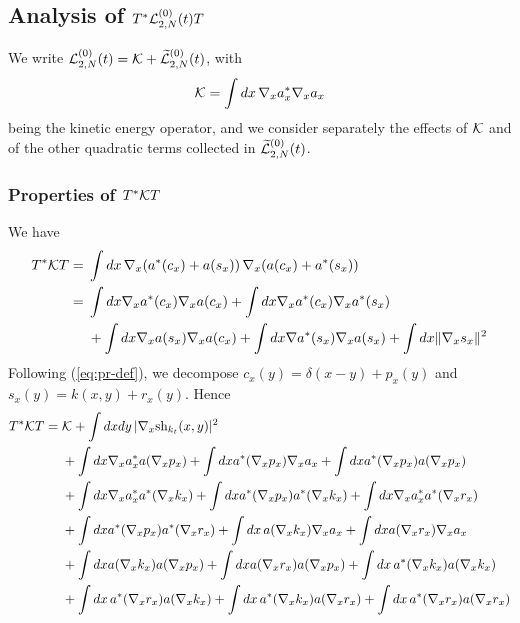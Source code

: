 \documentclass[11pt,a4paper]{article}
\newcommand{\wt}{\widetilde}
\newcommand{\cK}{{\cal K}}
\newcommand{\cL}{{\cal L}}
\begin{document}
\subsection{Analysis of $T^* \cL_{2,N}^{(0)} (t) T$}

We write $\cL_{2,N}^{(0)} (t) = \cK + \wt{\cL}_{2,N}^{(0)} (t)$, with \[ \cK = \int dx \, \nabla_x a^*_x \nabla_x a_x \] being the kinetic energy operator, and we consider separately the effects of $\cK$ 
and of the other quadratic terms collected in $\wt{\cL}_{2,N}^{(0)} (t)$. 

\subsubsection{Properties of $T^* \cK T$}

We have
\[ \begin{split} T^* \cK T = \; & \int dx \, \nabla_x (a^* (c_x) + a(s_x)) \, \nabla_x (a(c_x) + a^* (s_x)) \\
= \; & \int dx \nabla_x a^* (c_x) \nabla_x a(c_x) + \int dx \nabla_x a^* (c_x) \nabla_x a^* (s_x) \\ & + \int dx \nabla_x a(s_x) \nabla_x a(c_x) + \int dx \nabla a^* (s_x) \nabla_x a (s_x) + \int dx  \| \nabla_x s_x \|^2
\end{split} \]
Following (\ref{eq:pr-def}), we decompose  $c_x (y) = \delta (x-y) + p_x (y)$ and $s_x (y) = k (x,y) + r_x (y)$. Hence
\begin{equation}\label{eq:TKT} 
\begin{split} 
T^* \cK T = \; & \cK + \int dx dy \, | \nabla_x \text{sh}_{k_t} (x,y)|^2 \\  & + \int dx \nabla_x a^*_x a (\nabla_x p_x) + \int dx a^* (\nabla_x p_x) \nabla_x a_x + \int dx a^* (\nabla_x p_x) a (\nabla_x p_x)  \\ &+ \int dx \nabla_x a_x^* a^* (\nabla_x k_x)  + \int dx a^* (\nabla_x p_x) a^* (\nabla_x k_x) +  \int dx \nabla_x a_x^* a^* (\nabla_x r_x)  \\ & + \int dx a^* (\nabla_x p_x) a^* (\nabla_x r_x) + \int dx \, a(\nabla_x k_x) \nabla_x a_x + \int dx a(\nabla_x r_x) \nabla_x a_x  \\ & + \int dx a(\nabla_x k_x) a (\nabla_x p_x) + \int dx a(\nabla_x r_x) a(\nabla_x p_x) + \int dx \, a^* (\nabla_x k_x) a (\nabla_x k_x)  \\ & + \int dx \, a^* (\nabla_x r_x) a (\nabla_x k_x) + \int dx \, a^* (\nabla_x k_x) a(\nabla_x r_x) + \int dx \, a^* (\nabla_x r_x) a(\nabla_x r_x) 
\end{split} 
\end{equation}
\end{document}
